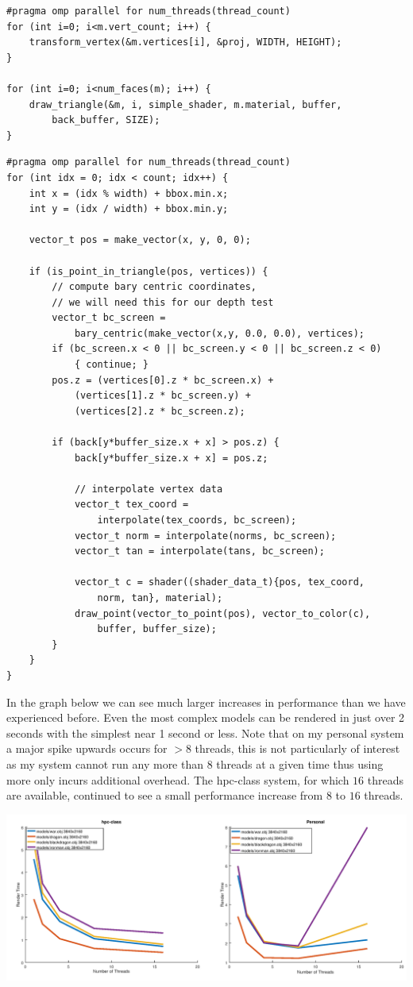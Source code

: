 \documentclass[12pt]{article}
\begin{document}
\begin{verbatim}
#pragma omp parallel for num_threads(thread_count)
for (int i=0; i<m.vert_count; i++) {
	transform_vertex(&m.vertices[i], &proj, WIDTH, HEIGHT);
}

for (int i=0; i<num_faces(m); i++) {
	draw_triangle(&m, i, simple_shader, m.material, buffer, 
		back_buffer, SIZE);
}
\end{verbatim}
\bigbreak
\begin{verbatim}
#pragma omp parallel for num_threads(thread_count)
for (int idx = 0; idx < count; idx++) {
	int x = (idx % width) + bbox.min.x;
	int y = (idx / width) + bbox.min.y;

	vector_t pos = make_vector(x, y, 0, 0);

	if (is_point_in_triangle(pos, vertices)) {
		// compute bary centric coordinates, 
		// we will need this for our depth test
		vector_t bc_screen = 
			bary_centric(make_vector(x,y, 0.0, 0.0), vertices);
		if (bc_screen.x < 0 || bc_screen.y < 0 || bc_screen.z < 0) 
			{ continue; }
		pos.z = (vertices[0].z * bc_screen.x) + 
			(vertices[1].z * bc_screen.y) + 
			(vertices[2].z * bc_screen.z);

		if (back[y*buffer_size.x + x] > pos.z) {
			back[y*buffer_size.x + x] = pos.z;

			// interpolate vertex data
			vector_t tex_coord = 
				interpolate(tex_coords, bc_screen);
			vector_t norm = interpolate(norms, bc_screen);
			vector_t tan = interpolate(tans, bc_screen);

			vector_t c = shader((shader_data_t){pos, tex_coord, 
				norm, tan}, material);
			draw_point(vector_to_point(pos), vector_to_color(c), 
				buffer, buffer_size);
		}
	}
}
\end{verbatim}

In the graph below we can see much larger increases in performance than we have 
experienced before. Even the most complex models can be rendered in just over 2 seconds
with the simplest near 1 second or less. Note that on my personal system a major spike upwards 
occurs for $>8$ threads, this is not particularly of interest as my system cannot run any more than
8 threads at a given time thus using more only incurs additional overhead. The hpc-class system,
for which $16$ threads are available, continued to see a small performance increase
from $8$ to $16$ threads.

\begin{center}
	\includegraphics[width=\textwidth]{method3.png}
\end{center}
\end{document}
